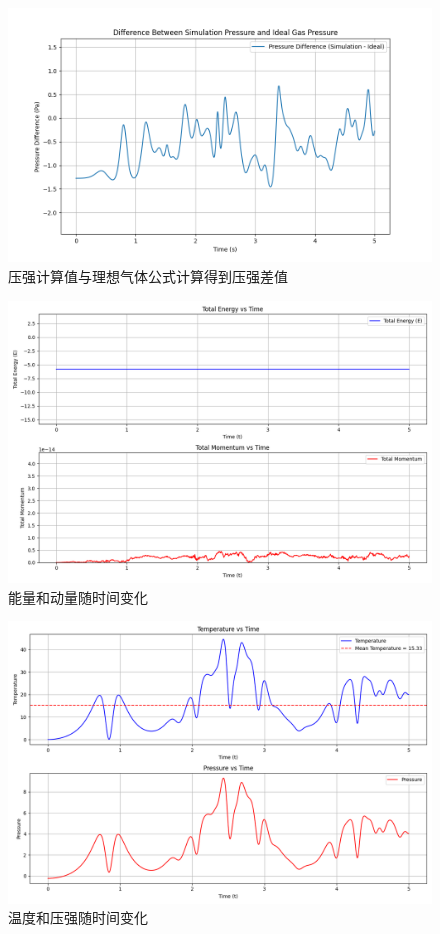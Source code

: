 \documentclass[11pt]{article}
\begin{document}
\begin{question}
\begin{figure}[H]
  \centering
  \includegraphics[width=0.7\columnwidth]{1/a3.png}
  \caption{压强计算值与理想气体公式计算得到压强差值}
\end{figure}

\begin{figure}[H]
  \centering
  \includegraphics[width=0.7\columnwidth]{1/b1.png}
  \caption{能量和动量随时间变化}
\end{figure}
\begin{figure}[H]
  \centering
  \includegraphics[width=0.7\columnwidth]{1/b2.png}
  \caption{温度和压强随时间变化}
\end{figure}


\end{question}
\end{document}
